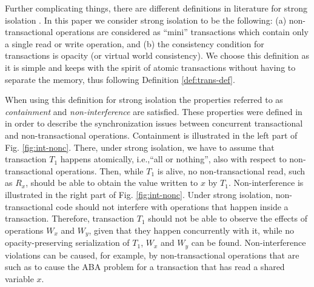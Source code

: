 Further complicating things, there  are different  definitions in  literature for  strong 
isolation \cite{blundell06,ma07,harris06}.
In this paper we consider strong isolation to be the following:
(a) non-transactional   operations   are   considered  as ``mini''
transactions which contain only a single  read or 
write operation, and (b) the consistency condition for transactions is opacity
(or virtual world consistency).
We choose this definition as it is simple and keeps with the spirit of atomic transactions
without having to separate the memory, thus following Definition \ref{def:trans-def}.
 
When using this definition for strong isolation the properties referred to as
{\it containment}  and {\it non-interference} are satisfied.
These properties were defined in \cite{blundell06} in order to describe
the synchronization issues between concurrent transactional and non-transactional operations.
Containment is   illustrated in  the  left  part of  Fig.
\ref{fig:int-nonc}.  There,
under strong  isolation, we have  to assume that transaction  $T_1$ happens
atomically,  
i.e.,``all  or  nothing'',   also  with  respect  to  non-transactional
operations. Then, while $T_1$ is  alive, no non-transactional read, such as
$R_x$, should be  
able to obtain  the value written to $x$  by $T_1$. Non-interference
is  illustrated  in  the right part of Fig.  \ref{fig:int-nonc}.  
Under  strong  isolation, non-transactional  
code   should  not  interfere   with  operations   that  happen   inside  a
transaction. Therefore, transaction $T_1$ should not be able to observe the
effects of  operations $W_x$ and $W_y$, given that they happen concurrently with it, 
while no opacity-preserving serialization of $T_1$, $W_x$ and $W_y$ can be found. 
Non-interference violations can be caused, for example,  by non-transactional 
operations that are such as to cause the ABA problem for a transaction that has 
read a shared variable $x$.

